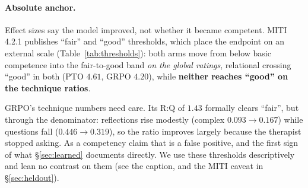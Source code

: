 \paragraph{Absolute anchor.} Effect sizes say the model improved, not whether it became
competent. MITI 4.2.1 publishes ``fair'' and ``good'' thresholds, which place the endpoint on
an external scale (Table~\ref{tab:thresholds}): both arms move from below basic competence into
the fair-to-good band \emph{on the global ratings}, relational crossing ``good'' in both (PTO
$4.61$, GRPO $4.20$), while \textbf{neither reaches ``good'' on the technique ratios}.

GRPO's technique numbers need care. Its R:Q of $1.43$ formally clears ``fair'', but through the
denominator: reflections rise modestly (complex $0.093\rightarrow0.167$) while questions fall
($0.446\rightarrow0.319$), so the ratio improves largely because the therapist stopped asking.
As a competency claim that is a false positive, and the first sign of what \S\ref{sec:learned}
documents directly. We use these thresholds descriptively and lean no contrast on them
(see the caption, and the MITI caveat in \S\ref{sec:heldout}).


